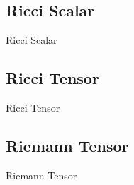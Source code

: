 \newpage
\setcounter{secnumdepth}{0}
\newpage



\subsection{Ricci Scalar}
\begin{definition}{Ricci Scalar}{}
\end{definition}



\subsection{Ricci Tensor}
\begin{definition}{Ricci Tensor}{}
\end{definition}




\subsection{Riemann Tensor}
\begin{definition}{Riemann Tensor}{}
\end{definition}





